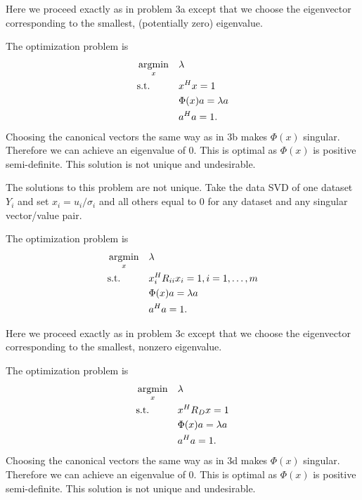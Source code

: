 Here we proceed exactly as in problem 3a except that we choose the eigenvector
corresponding to the smallest, (potentially zero) eigenvalue.

The optimization problem is 
\begin{equation*}
\begin{aligned}
&\mathop{\rm argmin}_{x}&&\lambda\\
&\text{s.t.} &&x^Hx  = 1\\
&&& \Phi(x) a = \lambda a\\
&&& a^Ha=1.\\
\end{aligned}
\end{equation*}
Choosing the canonical vectors the same way as in 3b makes $\Phi(x)$ singular. Therefore
we can achieve an eigenvalue of 0. This is optimal as $\Phi(x)$ is positive
semi-definite. This solution is not unique and undesirable. 

The solutions to this problem are not unique. Take the data SVD of one dataset $Y_i$ and
set $x_i = u_i/\sigma_i$ and all others equal to 0 for any dataset and any singular
vector/value pair.


The optimization problem is 
\begin{equation*}
\begin{aligned}
&\mathop{\rm argmin}_{x}&&\lambda\\
&\text{s.t.} &&x_i^HR_{ii}x_i  = 1, i=1,\dots,m\\
&&& \Phi(x) a = \lambda a\\
&&& a^Ha=1.\\
\end{aligned}
\end{equation*}

Here we proceed exactly as in problem 3c except that we choose the eigenvector
corresponding to the smallest, nonzero eigenvalue.



The optimization problem is 
\begin{equation*}
\begin{aligned}
&\mathop{\rm argmin}_{x}&&\lambda\\
&\text{s.t.} &&x^HR_Dx  = 1\\
&&& \Phi(x) a = \lambda a\\
&&& a^Ha=1.\\
\end{aligned}
\end{equation*}
Choosing the canonical vectors the same way as in 3d makes $\Phi(x)$ singular. Therefore
we can achieve an eigenvalue of 0. This is optimal as $\Phi(x)$ is positive
semi-definite. This solution is not unique and undesirable. 

